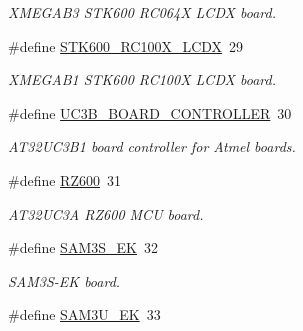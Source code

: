 \begin{DoxyCompactItemize}
\begin{DoxyCompactList}\small\item\em X\-M\-E\-G\-A\-B3 S\-T\-K600 R\-C064\-X L\-C\-D\-X board. \end{DoxyCompactList}\item 
\hypertarget{group__group__common__boards_gab6b4267fd4d74fbb8cf083764addfdc8}{\#define \hyperlink{group__group__common__boards_gab6b4267fd4d74fbb8cf083764addfdc8}{S\-T\-K600\-\_\-\-R\-C100\-X\-\_\-\-L\-C\-D\-X}~29}\label{group__group__common__boards_gab6b4267fd4d74fbb8cf083764addfdc8}

\begin{DoxyCompactList}\small\item\em X\-M\-E\-G\-A\-B1 S\-T\-K600 R\-C100\-X L\-C\-D\-X board. \end{DoxyCompactList}\item 
\hypertarget{group__group__common__boards_ga79a559c8d51d9370af4f37c36b6e7d58}{\#define \hyperlink{group__group__common__boards_ga79a559c8d51d9370af4f37c36b6e7d58}{U\-C3\-B\-\_\-\-B\-O\-A\-R\-D\-\_\-\-C\-O\-N\-T\-R\-O\-L\-L\-E\-R}~30}\label{group__group__common__boards_ga79a559c8d51d9370af4f37c36b6e7d58}

\begin{DoxyCompactList}\small\item\em A\-T32\-U\-C3\-B1 board controller for Atmel boards. \end{DoxyCompactList}\item 
\hypertarget{group__group__common__boards_ga4c22f34cf2ee08f07ce959d9a3009d85}{\#define \hyperlink{group__group__common__boards_ga4c22f34cf2ee08f07ce959d9a3009d85}{R\-Z600}~31}\label{group__group__common__boards_ga4c22f34cf2ee08f07ce959d9a3009d85}

\begin{DoxyCompactList}\small\item\em A\-T32\-U\-C3\-A R\-Z600 M\-C\-U board. \end{DoxyCompactList}\item 
\hypertarget{group__group__common__boards_ga35b2c40ce0679c6c73a010aa2c336a18}{\#define \hyperlink{group__group__common__boards_ga35b2c40ce0679c6c73a010aa2c336a18}{S\-A\-M3\-S\-\_\-\-E\-K}~32}\label{group__group__common__boards_ga35b2c40ce0679c6c73a010aa2c336a18}

\begin{DoxyCompactList}\small\item\em S\-A\-M3\-S-\/\-E\-K board. \end{DoxyCompactList}\item 
\hypertarget{group__group__common__boards_gab5023c1363a78928b59a1c58c9d424b7}{\#define \hyperlink{group__group__common__boards_gab5023c1363a78928b59a1c58c9d424b7}{S\-A\-M3\-U\-\_\-\-E\-K}~33}\label{group__group__common__boards_gab5023c1363a78928b59a1c58c9d424b7}


\end{DoxyCompactItemize}
